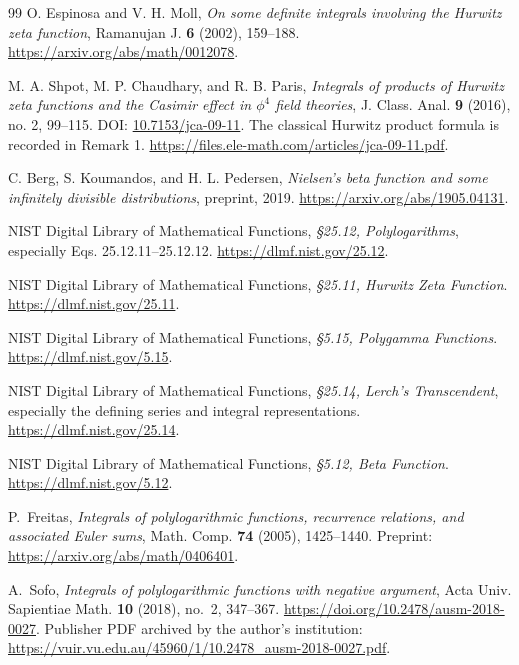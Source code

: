 \documentclass[11pt,letterpaper]{article}
\numberwithin{equation}{section}
\theoremstyle{definition}
\theoremstyle{remark}
\begin{document}
\begin{thebibliography}{99}
O. Espinosa and V. H. Moll,
\emph{On some definite integrals involving the Hurwitz zeta function},
Ramanujan J. \textbf{6} (2002), 159--188.
\url{https://arxiv.org/abs/math/0012078}.

M. A. Shpot, M. P. Chaudhary, and R. B. Paris,
\emph{Integrals of products of Hurwitz zeta functions and the Casimir
 effect in $\phi^4$ field theories},
J. Class. Anal. \textbf{9} (2016), no. 2, 99--115.
DOI: \href{https://doi.org/10.7153/jca-09-11}{10.7153/jca-09-11}.
The classical Hurwitz product formula is recorded in Remark 1.
\url{https://files.ele-math.com/articles/jca-09-11.pdf}.

C. Berg, S. Koumandos, and H. L. Pedersen,
\emph{Nielsen's beta function and some infinitely divisible distributions},
preprint, 2019.
\url{https://arxiv.org/abs/1905.04131}.

NIST Digital Library of Mathematical Functions,
\emph{\S25.12, Polylogarithms}, especially Eqs. 25.12.11--25.12.12.
\url{https://dlmf.nist.gov/25.12}.

NIST Digital Library of Mathematical Functions,
\emph{\S25.11, Hurwitz Zeta Function}.
\url{https://dlmf.nist.gov/25.11}.

NIST Digital Library of Mathematical Functions,
\emph{\S5.15, Polygamma Functions}.
\url{https://dlmf.nist.gov/5.15}.

NIST Digital Library of Mathematical Functions,
\emph{\S25.14, Lerch's Transcendent}, especially the defining series and
integral representations.
\url{https://dlmf.nist.gov/25.14}.

NIST Digital Library of Mathematical Functions,
\emph{\S5.12, Beta Function}.
\url{https://dlmf.nist.gov/5.12}.

P.~Freitas,
\emph{Integrals of polylogarithmic functions, recurrence relations, and
associated Euler sums},
Math. Comp. \textbf{74} (2005), 1425--1440.
Preprint: \url{https://arxiv.org/abs/math/0406401}.

A.~Sofo,
\emph{Integrals of polylogarithmic functions with negative argument},
Acta Univ. Sapientiae Math. \textbf{10} (2018), no.~2, 347--367.
\url{https://doi.org/10.2478/ausm-2018-0027}.
Publisher PDF archived by the author's institution:
\url{https://vuir.vu.edu.au/45960/1/10.2478_ausm-2018-0027.pdf}.

\end{thebibliography}
\endgroup

\end{document}
